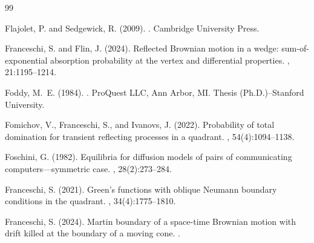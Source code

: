 \documentclass[11pt]{article}
\theoremstyle{definition}
\begin{document}
\begin{thebibliography}{99}

Flajolet, P. and Sedgewick, R. (2009).
.
\newblock Cambridge University Press.

Franceschi, S. and Flin, J. (2024).
\newblock Reflected Brownian motion in a wedge: sum-of-exponential absorption probability at the vertex and differential properties.
, 21:1195--1214.

Foddy, M.~E. (1984).
.
\newblock ProQuest LLC, Ann Arbor, MI.
\newblock Thesis (Ph.D.)–Stanford University.

Fomichov, V., Franceschi, S., and Ivanovs, J. (2022).
\newblock Probability of total domination for transient reflecting processes in a quadrant.
, 54(4):1094--1138.

Foschini, G. (1982).
\newblock Equilibria for diffusion models of pairs of communicating
  computers---symmetric case.
, 28(2):273--284.


Franceschi, S. (2021).
\newblock Green's functions with oblique Neumann boundary conditions in the quadrant.
, 34(4):1775--1810.

Franceschi, S. (2024).
\newblock Martin boundary of a space-time Brownian motion with drift killed at the boundary of a moving cone.
.


\end{thebibliography}
\end{document}
